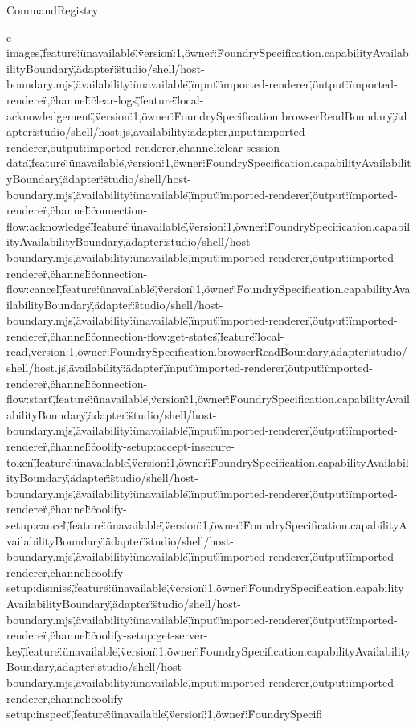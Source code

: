 \begin{lexlean}{CommandRegistry}
\begin{semanticmodule}
{e-images\",\"feature\":\"unavailable\",\"version\":1,\"owner\":\"FoundrySpecification.capabilityAvailabilityBoundary\",\"adapter\":\"studio/shell/host-boundary.mjs\",\"availability\":\"unavailable\",\"input\":\"imported-renderer\",\"output\":\"imported-renderer\"},{\"channel\":\"clear-logs\",\"feature\":\"local-acknowledgement\",\"version\":1,\"owner\":\"FoundrySpecification.browserReadBoundary\",\"adapter\":\"studio/shell/host.js\",\"availability\":\"adapter\",\"input\":\"imported-renderer\",\"output\":\"imported-renderer\"},{\"channel\":\"clear-session-data\",\"feature\":\"unavailable\",\"version\":1,\"owner\":\"FoundrySpecification.capabilityAvailabilityBoundary\",\"adapter\":\"studio/shell/host-boundary.mjs\",\"availability\":\"unavailable\",\"input\":\"imported-renderer\",\"output\":\"imported-renderer\"},{\"channel\":\"connection-flow:acknowledge\",\"feature\":\"unavailable\",\"version\":1,\"owner\":\"FoundrySpecification.capabilityAvailabilityBoundary\",\"adapter\":\"studio/shell/host-boundary.mjs\",\"availability\":\"unavailable\",\"input\":\"imported-renderer\",\"output\":\"imported-renderer\"},{\"channel\":\"connection-flow:cancel\",\"feature\":\"unavailable\",\"version\":1,\"owner\":\"FoundrySpecification.capabilityAvailabilityBoundary\",\"adapter\":\"studio/shell/host-boundary.mjs\",\"availability\":\"unavailable\",\"input\":\"imported-renderer\",\"output\":\"imported-renderer\"},{\"channel\":\"connection-flow:get-states\",\"feature\":\"local-read\",\"version\":1,\"owner\":\"FoundrySpecification.browserReadBoundary\",\"adapter\":\"studio/shell/host.js\",\"availability\":\"adapter\",\"input\":\"imported-renderer\",\"output\":\"imported-renderer\"},{\"channel\":\"connection-flow:start\",\"feature\":\"unavailable\",\"version\":1,\"owner\":\"FoundrySpecification.capabilityAvailabilityBoundary\",\"adapter\":\"studio/shell/host-boundary.mjs\",\"availability\":\"unavailable\",\"input\":\"imported-renderer\",\"output\":\"imported-renderer\"},{\"channel\":\"coolify-setup:accept-insecure-token\",\"feature\":\"unavailable\",\"version\":1,\"owner\":\"FoundrySpecification.capabilityAvailabilityBoundary\",\"adapter\":\"studio/shell/host-boundary.mjs\",\"availability\":\"unavailable\",\"input\":\"imported-renderer\",\"output\":\"imported-renderer\"},{\"channel\":\"coolify-setup:cancel\",\"feature\":\"unavailable\",\"version\":1,\"owner\":\"FoundrySpecification.capabilityAvailabilityBoundary\",\"adapter\":\"studio/shell/host-boundary.mjs\",\"availability\":\"unavailable\",\"input\":\"imported-renderer\",\"output\":\"imported-renderer\"},{\"channel\":\"coolify-setup:dismiss\",\"feature\":\"unavailable\",\"version\":1,\"owner\":\"FoundrySpecification.capabilityAvailabilityBoundary\",\"adapter\":\"studio/shell/host-boundary.mjs\",\"availability\":\"unavailable\",\"input\":\"imported-renderer\",\"output\":\"imported-renderer\"},{\"channel\":\"coolify-setup:get-server-key\",\"feature\":\"unavailable\",\"version\":1,\"owner\":\"FoundrySpecification.capabilityAvailabilityBoundary\",\"adapter\":\"studio/shell/host-boundary.mjs\",\"availability\":\"unavailable\",\"input\":\"imported-renderer\",\"output\":\"imported-renderer\"},{\"channel\":\"coolify-setup:inspect\",\"feature\":\"unavailable\",\"version\":1,\"owner\":\"FoundrySpecifi}
\end{semanticmodule}
\end{lexlean}
